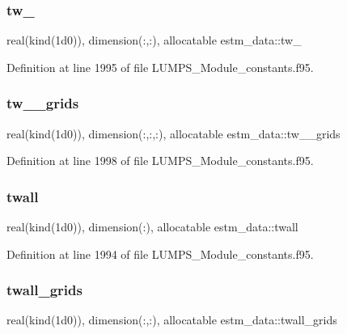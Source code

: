 \subsubsection{\texorpdfstring{tw\+\_}{tw\_4}}
{\footnotesize\ttfamily real(kind(1d0)), dimension(\+:,\+:), allocatable estm\+\_\+data\+::tw\+\_}



Definition at line 1995 of file L\+U\+M\+P\+S\+\_\+\+Module\+\_\+constants.\+f95.

\mbox{\label{namespaceestm__data_a7efa720ab891f65c5700635a46075a0e}} 
\subsubsection{\texorpdfstring{tw\+\_\+\_\+grids}{tw\_4\_grids}}
{\footnotesize\ttfamily real(kind(1d0)), dimension(\+:,\+:,\+:), allocatable estm\+\_\+data\+::tw\+\_\+\_\+grids}



Definition at line 1998 of file L\+U\+M\+P\+S\+\_\+\+Module\+\_\+constants.\+f95.

\mbox{\label{namespaceestm__data_a49312a4b669374fd5b4128e85f1d08b6}} 
\subsubsection{\texorpdfstring{twall}{twall}}
{\footnotesize\ttfamily real(kind(1d0)), dimension(\+:), allocatable estm\+\_\+data\+::twall}



Definition at line 1994 of file L\+U\+M\+P\+S\+\_\+\+Module\+\_\+constants.\+f95.

\mbox{\label{namespaceestm__data_ac581f9c4ab011d112e60e855c575f705}} 
\subsubsection{\texorpdfstring{twall\+\_\+grids}{twall\_grids}}
{\footnotesize\ttfamily real(kind(1d0)), dimension(\+:,\+:), allocatable estm\+\_\+data\+::twall\+\_\+grids}



